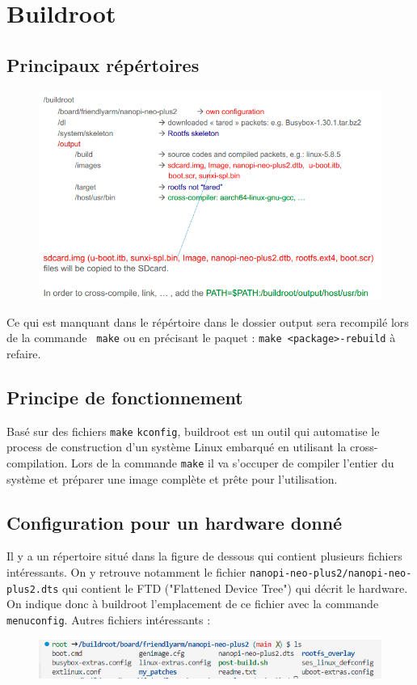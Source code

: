 \section{Buildroot}
\subsection{Principaux répértoires}
\begin{figure}[H]
\centering
\includegraphics[width=0.9\columnwidth]{Figures/buildroot_01.png}
\end{figure}
Ce qui est manquant dans le répértoire dans le dossier output sera recompilé lors de la commande \verb! make! ou en précisant le paquet : \verb!make <package>-rebuild! à refaire.
\subsection{Principe de fonctionnement}
Basé sur des fichiers \verb!make! \verb!kconfig!, buildroot est un outil qui automatise le process de construction d'un système Linux embarqué en utilisant la cross-compilation. Lors de la commande \verb!make! il va s'occuper de compiler l'entier du système et préparer une image complète et prête pour l'utilisation.
\subsection{Configuration pour un hardware donné}
Il y a un répertoire situé dans la figure de dessous qui contient plusieurs fichiers intéressants. On y retrouve notamment le fichier \verb!nanopi-neo-plus2/nanopi-neo-plus2.dts! qui contient le FTD ("Flattened Device Tree") qui décrit le hardware. On indique donc à buildroot l'emplacement de ce fichier avec la commande \verb!menuconfig!. Autres fichiers intéressants : 
\begin{figure}[H]
\centering
\includegraphics[width=0.9\columnwidth]{Figures/buildroot_02.png}
\end{figure}
